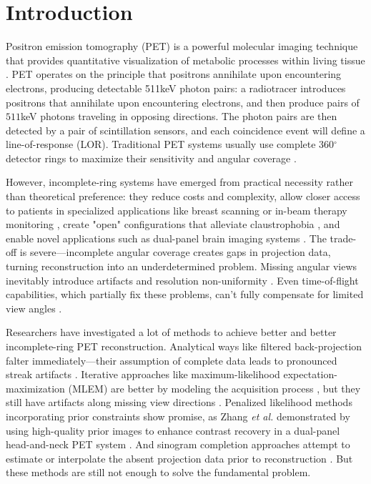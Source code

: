 \documentclass[aps,prb,preprint,groupedaddress,showkeys]{revtex4}
\begin{document}

\section{Introduction}
\label{chap:introduction}

Positron emission tomography (PET) is a powerful molecular imaging technique that provides quantitative visualization of metabolic processes within living tissue \cite{townsend2004, muehllehner2006positron, lameka2016positron, shukla2006positron, nutt2002history}. PET operates on the principle that positrons annihilate upon encountering electrons, producing detectable 511keV photon pairs: a radiotracer introduces positrons that annihilate upon encountering electrons, and then produce pairs of $511$keV photons traveling in opposing directions. 
The photon pairs are then detected by a pair of scintillation sensors, and each coincidence event will define a line-of-response (LOR).
Traditional PET systems usually use complete 360$^\circ$ detector rings to maximize their sensitivity and angular coverage \cite{townsend2004}.

However, incomplete-ring systems have emerged from practical necessity rather than theoretical preference: they reduce costs and complexity, allow closer access to patients in specialized applications like breast scanning or in-beam therapy monitoring \cite{surti2008}, create "open" configurations that alleviate claustrophobia \cite{tashima2012, krishnamoorthy2021}, and enable novel applications such as dual-panel brain imaging systems \cite{zhang2020}. The trade-off is severe—incomplete angular coverage creates gaps in projection data, turning reconstruction into an underdetermined problem. Missing angular views inevitably introduce artifacts and resolution non-uniformity \cite{kak1988, surti2008}. Even time-of-flight capabilities, which partially fix these problems, can't fully compensate for limited view angles \cite{surti2008, krishnamoorthy2021}.

Researchers have investigated a lot of methods to achieve better and better incomplete-ring PET reconstruction. Analytical ways like filtered back-projection falter immediately—their assumption of complete data leads to pronounced streak artifacts \cite{kak1988}. Iterative approaches like maximum-likelihood expectation-maximization (MLEM) are better by modeling the acquisition process \cite{qi2006}, but they still have artifacts along missing view directions \cite{zhang2020}.
Penalized likelihood methods incorporating prior constraints show promise, as Zhang \textit{et al.} demonstrated by using high-quality prior images to enhance contrast recovery in a dual-panel head-and-neck PET system \cite{zhang2020}. And sinogram completion approaches attempt to estimate or interpolate the absent projection data prior to reconstruction \cite{makkar2024partial}. But these methods are still not enough to solve the fundamental problem. 
\end{document}

